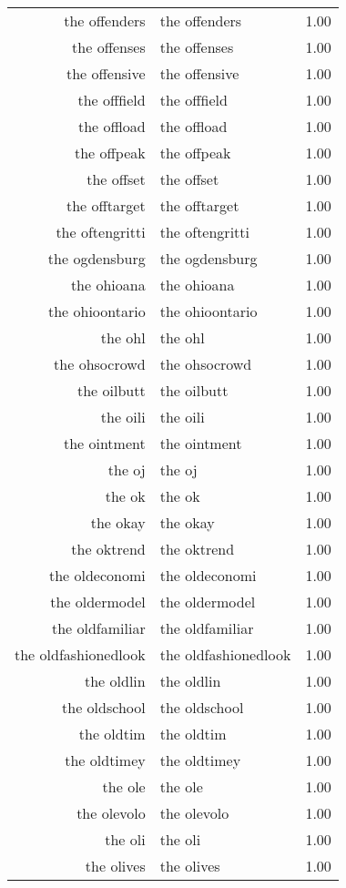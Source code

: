 \begin{table}[ht]
\begin{tabular}{rlr}
  the offenders & the offenders & 1.00 \\ 
  the offenses & the offenses & 1.00 \\ 
  the offensive & the offensive & 1.00 \\ 
  the offfield & the offfield & 1.00 \\ 
  the offload & the offload & 1.00 \\ 
  the offpeak & the offpeak & 1.00 \\ 
  the offset & the offset & 1.00 \\ 
  the offtarget & the offtarget & 1.00 \\ 
  the oftengritti & the oftengritti & 1.00 \\ 
  the ogdensburg & the ogdensburg & 1.00 \\ 
  the ohioana & the ohioana & 1.00 \\ 
  the ohioontario & the ohioontario & 1.00 \\ 
  the ohl & the ohl & 1.00 \\ 
  the ohsocrowd & the ohsocrowd & 1.00 \\ 
  the oilbutt & the oilbutt & 1.00 \\ 
  the oili & the oili & 1.00 \\ 
  the ointment & the ointment & 1.00 \\ 
  the oj & the oj & 1.00 \\ 
  the ok & the ok & 1.00 \\ 
  the okay & the okay & 1.00 \\ 
  the oktrend & the oktrend & 1.00 \\ 
  the oldeconomi & the oldeconomi & 1.00 \\ 
  the oldermodel & the oldermodel & 1.00 \\ 
  the oldfamiliar & the oldfamiliar & 1.00 \\ 
  the oldfashionedlook & the oldfashionedlook & 1.00 \\ 
  the oldlin & the oldlin & 1.00 \\ 
  the oldschool & the oldschool & 1.00 \\ 
  the oldtim & the oldtim & 1.00 \\ 
  the oldtimey & the oldtimey & 1.00 \\ 
  the ole & the ole & 1.00 \\ 
  the olevolo & the olevolo & 1.00 \\ 
  the oli & the oli & 1.00 \\ 
  the olives & the olives & 1.00 \\ 

\end{tabular}
\end{table}
